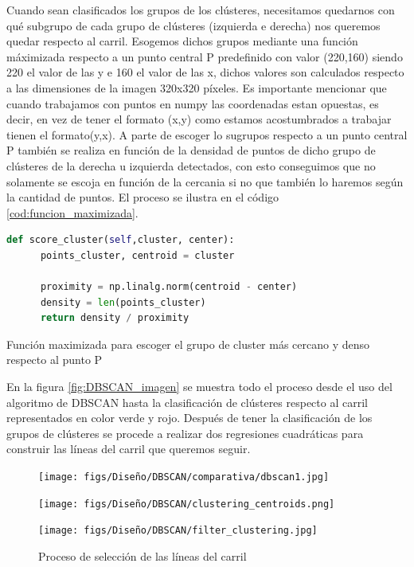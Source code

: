 Cuando sean clasificados los grupos de los clústeres, necesitamos quedarnos con qué subgrupo de cada grupo de clústeres (izquierda e derecha) nos queremos quedar respecto al carril. Esogemos dichos grupos mediante una función máximizada 
respecto a un punto central P predefinido con valor (220,160) siendo 220 el valor de las y e 160 el valor de las x, dichos valores son calculados respecto 
a las dimensiones de la imagen 320x320 píxeles. Es importante mencionar que cuando trabajamos con puntos en numpy las coordenadas estan opuestas, es decir, en vez de tener el formato (x,y) como estamos acostumbrados a trabajar tienen el formato(y,x). 
A parte de escoger lo sugrupos respecto a un punto central P también se realiza en función de la densidad de puntos de dicho grupo de clústeres de la derecha u izquierda detectados, 
con esto conseguimos que no solamente se escoja en función de la cercania si no que también lo haremos según la cantidad de puntos. El proceso se ilustra 
en el código \ref{cod:funcion_maximizada}.\newline

\begin{code}[h]
  \begin{lstlisting}[language=Python]
    def score_cluster(self,cluster, center):
      points_cluster, centroid = cluster
    
      proximity = np.linalg.norm(centroid - center)
      density = len(points_cluster)
      return density / proximity

  \end{lstlisting}
  \caption[Función maximizada para escoger el grupo de cluster más cercano y denso respecto al punto P]{Función maximizada para escoger el grupo de cluster más cercano y denso respecto al punto P}
  \label{cod:funcion_maximizada}
  \end{code}  

  En la figura \ref{fig:DBSCAN_imagen} se muestra todo el proceso desde el uso del algoritmo de DBSCAN hasta la clasificación de clústeres respecto al carril 
  representados en color verde y rojo. Después de tener la clasificación de los grupos de clústeres se procede a realizar dos regresiones cuadráticas para construir las líneas del carril que queremos seguir.


  \begin{figure}[H]
    \centering
    \begin{minipage}{0.3\textwidth}
      \texttt{[image: figs/Diseño/DBSCAN/comparativa/dbscan1.jpg]}
    \end{minipage}
    \hfill
    \begin{minipage}{0.3\textwidth}
      \texttt{[image: figs/Diseño/DBSCAN/clustering\_centroids.png]}
    \end{minipage}
    \hfill
    \begin{minipage}{0.3\textwidth}
      \texttt{[image: figs/Diseño/DBSCAN/filter\_clustering.jpg]}
    \end{minipage}
    \caption{Proceso de selección de las líneas del carril}
    \label{fig:comparativa}
  \end{figure}

